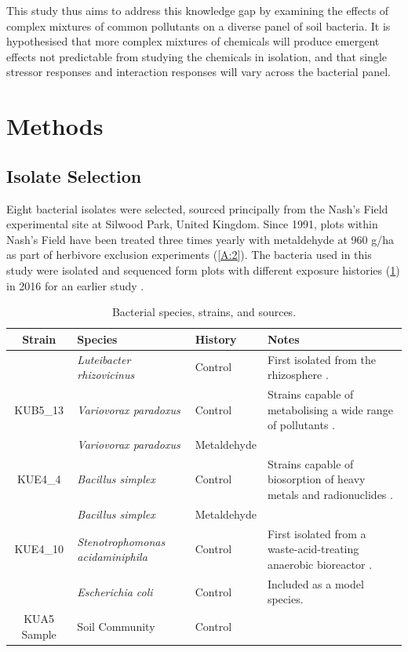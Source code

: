 \documentclass[final,1p,times]{elsarticle}
\begin{document}
This study thus aims to address this knowledge gap by examining the effects of complex mixtures of common pollutants on a diverse panel of soil bacteria. It is hypothesised that more complex mixtures of chemicals will produce emergent effects not predictable from studying the chemicals in isolation, and that single stressor responses and interaction responses will vary across the bacterial panel.

\section{Methods}
\label{S:2}
\subsection{Isolate Selection}
\label{S:2:1}

Eight bacterial isolates were selected, sourced principally from the Nash's Field experimental site at Silwood Park, United Kingdom. Since 1991, plots within Nash's Field have been treated three times yearly with metaldehyde at 960 g/ha as part of herbivore exclusion experiments \cite{Allan2011ContrastingExperiment} (\cref{A:2}). The bacteria used in this study were isolated and sequenced form plots with different exposure histories (\cref{tab:isolates}) in 2016 for an earlier study \cite{Mombrikotb2016}. 

\begin{table}[ht]
\begin{small}
\centering
\begin{tabular}{c p{3.1cm} l p{5.2cm}}
\toprule 
\textbf{{Strain}} & \textbf{{Species}} & \textbf{{History}} & \textbf{{Notes}} \\
\midrule
\rowcolor{gggrey}{LUF4\_5} & \textit{Luteibacter rhizovicinus} & Control & First isolated from the rhizosphere \cite{Johansen2005LuteibacterL.}. \\
{KUB5\_13} & \textit{Variovorax paradoxus} & Control & Strains capable of metabolising a wide range of pollutants \cite{Satola2013MetabolicParadoxus}. \\
\rowcolor{gggrey}{NUF1\_3} & \textit{Variovorax paradoxus} & Metaldehyde & \\
{KUE4\_4} & \textit{Bacillus simplex} & Control & Strains capable of biosorption of heavy metals and radionuclides \cite{Valentine1996BiosorptionZone}. \\
\rowcolor{gggrey}{NUE1\_1} & \textit{Bacillus simplex} & Metaldehyde & \\
{KUE4\_10} & \textit{Stenotrophomonas \newline acidaminiphila} & Control & First isolated from a waste-acid-treating anaerobic bioreactor \cite{Assih2002}. \\
\rowcolor{gggrey}{OP50} & \textit{Escherichia coli} & Control & Included as a model species. \\
{KUA5 Sample} & Soil Community & Control & \\
\bottomrule
\end{tabular}
\caption{Bacterial species, strains, and sources.}
\label{tab:isolates}
\end{small}
\end{table}
\end{document}
